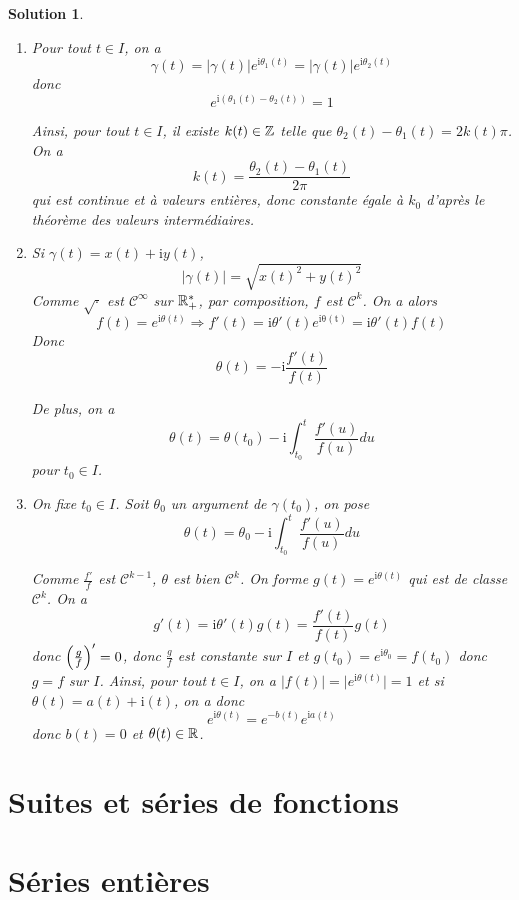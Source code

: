 \documentclass[12pt]{article}
\newtheorem{solution}{Solution}[section]
\theoremstyle{remark}
\numberwithin{equation}{section}
\begin{document}
\begin{solution}
	\phantom{}
	\begin{enumerate}
		\item Pour tout $t\in I$, on a 
		$$\gamma(t)=\vert\gamma(t)\vert e^{\mathrm{i}\theta_{1}(t)}=\vert\gamma(t)\vert e^{\mathrm{i}\theta_{2}(t)}$$
		donc 
		$$e^{\mathrm{i}(\theta_{1}(t)-\theta_{2}(t))}=1$$

		Ainsi, pour tout $t\in I$, il existe $k(t)\in\mathbb{Z}$ telle que $\theta_{2}(t)-\theta_{1}(t)=2k(t)\pi$. On a 
		$$k(t)=\frac{\theta_{2}(t)-\theta_{1}(t)}{2\pi}$$
		qui est continue et à valeurs entières, donc constante égale à $k_{0}$ d'après le théorème des valeurs intermédiaires.

		\item Si $\gamma(t)=x(t)+\mathrm{i}y(t)$, 
		$$\vert\gamma(t)\vert=\sqrt{x(t)^{2}+y(t)^{2}}$$
		Comme $\sqrt{\cdot}$ est $\mathcal{C}^{\infty}$ sur $\mathbb{R}_{+}^{*}$, par composition, $f$ est $\mathcal{C}^{k}$. On a alors
		$$f(t)=e^{\mathrm{i}\theta(t)}\Rightarrow f'(t)=\mathrm{i}\theta'(t)e^{\mathrm{i\theta(t)}}=\mathrm{i}\theta'(t)f(t)$$
		Donc 
		$$\theta(t)=-\mathrm{i}\frac{f'(t)}{f(t)}$$

		De plus, on a 
		$$\theta(t)=\theta(t_{0})-\mathrm{i}\int_{t_{0}}^{t}\frac{f'(u)}{f(u)}du$$
		pour $t_{0}\in I$.

		\item On fixe $t_{0}\in I$. Soit $\theta_{0}$ un argument de $\gamma(t_{0})$, on pose 
		$$\theta(t)=\theta_{0}-\mathrm{i}\int_{t_{0}}^{t}\frac{f'(u)}{f(u)}du$$
		
		Comme $\frac{f'}{f}$ est $\mathcal{C}^{k-1}$, $\theta$ est bien $\mathcal{C}^{k}$. On forme $g(t)=e^{\mathrm{i}\theta(t)}$ qui est de classe $\mathcal{C}^{k}$. On a 
		$$g'(t)=\mathrm{i}\theta'(t)g(t)=\frac{f'(t)}{f(t)}g(t)$$
		donc $\Bigl(\frac{g}{f}\Bigr)'=0$, donc $\frac{g}{f}$ est constante sur $I$ et $g(t_{0})=e^{\mathrm{i}\theta_{0}}=f(t_{0})$ donc $g=f$ sur $I$. Ainsi, pour tout $t\in I$, on a $\vert f(t)\vert=\vert e^{\mathrm{i}\theta(t)}\vert=1$ et si $\theta(t)=a(t)+\mathrm{i}(t)$, on a donc 
		$$e^{\mathrm{i}\theta(t)}=e^{-b(t)}e^{\mathrm{i}a(t)}$$
		donc $b(t)=0$ et $\theta(t)\in\mathbb{R}$.
	\end{enumerate}
\end{solution}

\section{Suites et séries de fonctions}
\section{Séries entières}
\end{document}
